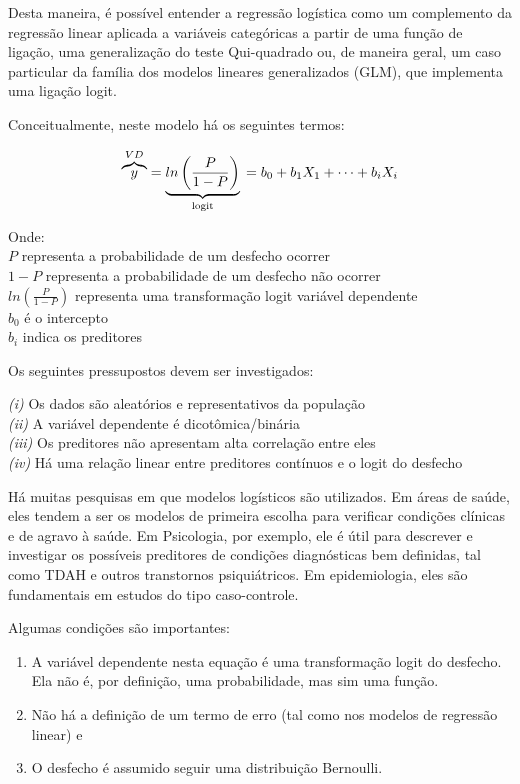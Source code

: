 \documentclass[
]{book}
\providecommand{\tightlist}{%
  \setlength{\itemsep}{0pt}\setlength{\parskip}{0pt}}
\begin{document}
Desta maneira, é possível entender a regressão logística como um complemento da regressão linear aplicada a variáveis categóricas a partir de uma função de ligação, uma generalização do teste Qui-quadrado ou, de maneira geral, um caso particular da família dos modelos lineares generalizados (GLM), que implementa uma ligação logit.

Conceitualmente, neste modelo há os seguintes termos:

\[\overbrace{y}^{VD} = \underbrace{ln\left ( \frac{P}{1-P} \right)}_\text{logit} \\= b_0+b_1X_1+ \dots + b_iX_i\]

Onde:\\
\(P\) representa a probabilidade de um desfecho ocorrer\\
\(1-P\) representa a probabilidade de um desfecho não ocorrer\\
\(ln\left ( \frac{P}{1-P} \right)\) representa uma transformação logit variável dependente\\
\(b_0\) é o intercepto\\
\(b_i\) indica os preditores

Os seguintes pressupostos devem ser investigados:

\emph{(i)} Os dados são aleatórios e representativos da população\\
\emph{(ii)} A variável dependente é dicotômica/binária\\
\emph{(iii)} Os preditores não apresentam alta correlação entre eles\\
\emph{(iv)} Há uma relação linear entre preditores contínuos e o logit do desfecho

Há muitas pesquisas em que modelos logísticos são utilizados. Em áreas de saúde, eles tendem a ser os modelos de primeira escolha para verificar condições clínicas e de agravo à saúde. Em Psicologia, por exemplo, ele é útil para descrever e investigar os possíveis preditores de condições diagnósticas bem definidas, tal como TDAH e outros transtornos psiquiátricos. Em epidemiologia, eles são fundamentais em estudos do tipo caso-controle.

Algumas condições são importantes:

\begin{enumerate}
\def\labelenumi{(\arabic{enumi})}
\tightlist
\item
  A variável dependente nesta equação é uma transformação logit do desfecho. Ela não é, por definição, uma probabilidade, mas sim uma função.\\
\item
  Não há a definição de um termo de erro (tal como nos modelos de regressão linear) e\\
\item
  O desfecho é assumido seguir uma distribuição Bernoulli.
\end{enumerate}
\end{document}
